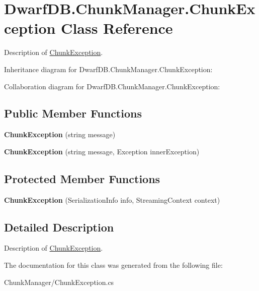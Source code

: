 \hypertarget{class_dwarf_d_b_1_1_chunk_manager_1_1_chunk_exception}{\section{Dwarf\+D\+B.\+Chunk\+Manager.\+Chunk\+Exception Class Reference}
\label{class_dwarf_d_b_1_1_chunk_manager_1_1_chunk_exception}
}


Description of \hyperlink{class_dwarf_d_b_1_1_chunk_manager_1_1_chunk_exception}{Chunk\+Exception}.  




Inheritance diagram for Dwarf\+D\+B.\+Chunk\+Manager.\+Chunk\+Exception\+:


Collaboration diagram for Dwarf\+D\+B.\+Chunk\+Manager.\+Chunk\+Exception\+:
\subsection*{Public Member Functions}
\begin{DoxyCompactItemize}
\item 
\hypertarget{class_dwarf_d_b_1_1_chunk_manager_1_1_chunk_exception_a505308a394244643c3fed2e017f775ec}{{\bfseries Chunk\+Exception} (string message)}\label{class_dwarf_d_b_1_1_chunk_manager_1_1_chunk_exception_a505308a394244643c3fed2e017f775ec}

\item 
\hypertarget{class_dwarf_d_b_1_1_chunk_manager_1_1_chunk_exception_a677ad83cf99a19262d566195900ca9f3}{{\bfseries Chunk\+Exception} (string message, Exception inner\+Exception)}\label{class_dwarf_d_b_1_1_chunk_manager_1_1_chunk_exception_a677ad83cf99a19262d566195900ca9f3}

\end{DoxyCompactItemize}
\subsection*{Protected Member Functions}
\begin{DoxyCompactItemize}
\item 
\hypertarget{class_dwarf_d_b_1_1_chunk_manager_1_1_chunk_exception_a32ada1c2000e89dabcf22fc250e3bff4}{{\bfseries Chunk\+Exception} (Serialization\+Info info, Streaming\+Context context)}\label{class_dwarf_d_b_1_1_chunk_manager_1_1_chunk_exception_a32ada1c2000e89dabcf22fc250e3bff4}

\end{DoxyCompactItemize}


\subsection{Detailed Description}
Description of \hyperlink{class_dwarf_d_b_1_1_chunk_manager_1_1_chunk_exception}{Chunk\+Exception}. 



The documentation for this class was generated from the following file\+:\begin{DoxyCompactItemize}
\item 
Chunk\+Manager/Chunk\+Exception.\+cs\end{DoxyCompactItemize}
